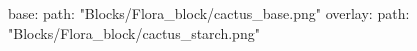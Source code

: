 base:
  path: "Blocks/Flora_block/cactus_base.png"
overlay:
  path: "Blocks/Flora_block/cactus_starch.png"
